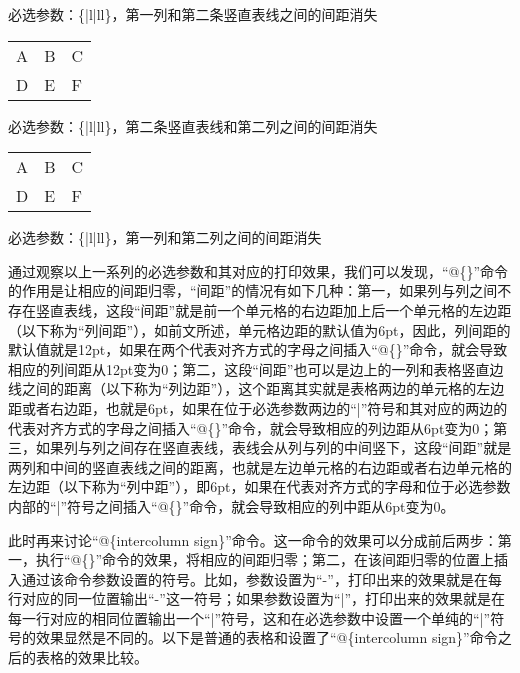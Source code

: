 ﻿\documentclass{article}
\begin{document}
    必选参数：\{|l{}|ll\}，第一列和第二条竖直表线之间的间距消失

    \mbox{}

    \begin{tabular}{|l|@{}ll}
        \hline
        A&B&C\\
        D&E&F\\
        \hline
    \end{tabular}

    \mbox{}

    必选参数：\{|l|{}ll\}，第二条竖直表线和第二列之间的间距消失

    \mbox{}

    \begin{tabular}{|l@{}|@{}ll}
        \hline
        A&B&C\\
        D&E&F\\
        \hline
    \end{tabular}

    \mbox{}

    必选参数：\{|l{}|{}ll\}，第一列和第二列之间的间距消失
    
    通过观察以上一系列的必选参数和其对应的打印效果，我们可以发现，``@\{\}''命令的作用是让相应的间距归零，``间距''的情况有如下几种：第一，如果列与列之间不存在竖直表线，这段``间距''就是前一个单元格的右边距加上后一个单元格的左边距（以下称为``列间距''），如前文所述，单元格边距的默认值为6pt，因此，列间距的默认值就是12pt，如果在两个代表对齐方式的字母之间插入``@\{\}''命令，就会导致相应的列间距从12pt变为0；第二，这段``间距''也可以是边上的一列和表格竖直边线之间的距离（以下称为``列边距''），这个距离其实就是表格两边的单元格的左边距或者右边距，也就是6pt，如果在位于必选参数两边的``|''符号和其对应的两边的代表对齐方式的字母之间插入``@\{\}''命令，就会导致相应的列边距从6pt变为0；第三，如果列与列之间存在竖直表线，表线会从列与列的中间竖下，这段``间距''就是两列和中间的竖直表线之间的距离，也就是左边单元格的右边距或者右边单元格的左边距（以下称为``列中距''），即6pt，如果在代表对齐方式的字母和位于必选参数内部的``|''符号之间插入``@\{\}''命令，就会导致相应的列中距从6pt变为0。

    此时再来讨论``@\{intercolumn sign\}''命令。这一命令的效果可以分成前后两步：第一，执行``@\{\}''命令的效果，将相应的间距归零；第二，在该间距归零的位置上插入通过该命令参数设置的符号。比如，参数设置为``-''，打印出来的效果就是在每行对应的同一位置输出``-''这一符号；如果参数设置为``|''，打印出来的效果就是在每一行对应的相同位置输出一个``|''符号，这和在必选参数中设置一个单纯的``|''符号的效果显然是不同的。以下是普通的表格和设置了``@\{intercolumn sign\}''命令之后的表格的效果比较。
\end{document}
